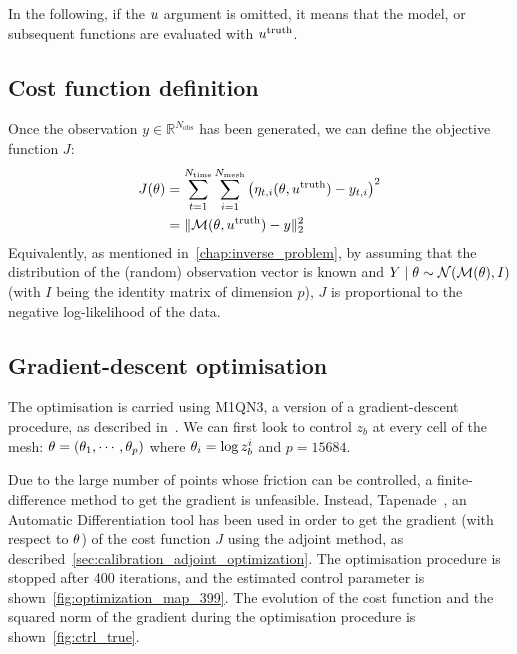 \documentclass[../../Main_ManuscritThese.tex]{subfiles}
\newcommand{\zob}{z_b}
\begin{document}
In the following, if the $u$ argument is omitted, it means that the
model, or subsequent functions are evaluated with
$u^{\mathrm{truth}}$.
\subsection{Cost function definition}
Once the observation $y \in \mathbb{R}^{N_{\mathrm{obs}}}$ has been generated, we can
define the objective function $J$:
\begin{align}
  \label{eq:cost_fun_definition}
  J(\theta) &= \sum_{t=1}^{ N_{\mathrm{time}}}\sum_{i=1}^{N_{\mathrm{mesh}}}  \left(\eta_{t,i}(\theta,u^{\mathrm{truth}}) - y_{t, i}\right)^2 \\
         &= \|\mathcal{M}(\theta,u^{\mathrm{truth}}) - y\|_2^2
\end{align}
Equivalently, as mentioned in~\cref{chap:inverse_problem}, by assuming
that the distribution of the (random) observation vector is known and
$Y \mid \theta \sim \mathcal{N}(\mathcal{M}(\theta), I)$ (with $I$ being the
identity matrix of dimension $p$), $J$ is proportional to the negative
log-likelihood of the data.

\subsection{Gradient-descent optimisation}
\label{ssec:optim_gradient}
The optimisation is carried using M1QN3, a version of a
gradient-descent procedure, as described
in~\cite{gilbert_numerical_1989}. We can first look to control $\zob$
at every cell of the mesh: $\theta = (\theta_1,\cdots, \theta_p)$ where
$\kk_i = \log\zob^i$ and $p=\num{15684}$.

Due to the large number of points whose friction can be controlled, a
finite-difference method to get the gradient is unfeasible. Instead,
Tapenade~\citep{hascoet_tapenade_2013}, an Automatic Differentiation
tool has been used in order to get the gradient (with respect to
$\theta$) of the cost function $J$ using the adjoint method, as
described~\cref{sec:calibration_adjoint_optimization}. The
optimisation procedure is stopped after \num{400} iterations, and the
estimated control parameter is
shown~\cref{fig:optimization_map_399}. The evolution of the cost
function and the squared norm of the gradient during the optimisation
procedure is shown~\cref{fig:ctrl_true}.
\end{document}

